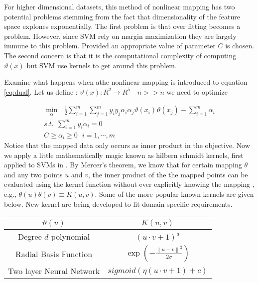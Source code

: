 For higher dimensional datasets, this method of nonlinear mapping  has two potential problems stemming from the fact that dimensionality of the feature space explones exponentially. The first problem is that over fitting becomes a problem. However, since SVM rely on margin maximization they are largely immune to this problem. Provided an appropriate value of parameter $C$ is chosen. The second concern is that it is the computational complexity of   computing $\vartheta(x)$ but SVM use kernels to get around this problem.  

Examine what happens when athe nonlinear mapping is introduced to equation \ref{eq:dual}. Let us define : $\vartheta(x):R^2\rightarrow R^5 \quad n>> n$  we need to optimize

\begin{equation}
\begin{array}{c}
\min_{\alpha} \ \ \   \frac{1}{2} \sum_{i=1}^{m}{\sum_{j=1}^{m}{y_iy_j\alpha_i\alpha_j\vartheta(x_i)\vartheta(x_j)}} - \sum_{i=1}^{m}{\alpha_i} \\
s.t. \ \ \sum_{i=1}^{m}{y_i\alpha_i}=0   \\
 C \geq \alpha_i \geq 0  \ \ \ i=1,\cdots , m 
 \end{array} 
\label{eq:dualkernel}
\end{equation}
Notice that the mapped data only occurs as inner product in the objective. Now we apply a little mathematically magic known as hilbern schmidt kernels, first applied to SVMs in \cite{svmintroduce}.  By Mercer's theorem, we know that for certain mapping $\theta$ and any two points $u$ and $v$, the inner product of the the mapped points can be evaluated using the kernel function without ever explicitly knowing the mapping , e.g., $\theta(u)\theta(v)\equiv K(u,v)$. Some of the more popular known kernels are given below. New kernel are being developed to fit domain specific requirements. 
\begin{center}
	\begin{tabular}{cc}
	$\vartheta(u)$  & $K(u,v)$ \\ \hline 
	Degree $d$ polynomial & $\left(u\cdot v +1\right)^d$ \\ 
	Radial Basis Function & $\exp \left( - \frac{\left\|u-v\right\|^2}{2\sigma}\right) $ \\ 
		Two layer Neural Network& $ sigmoid \left(\eta\left(u\cdot v +1\right)+c\right)$ \\ 
		
	\end{tabular}
\end{center}
